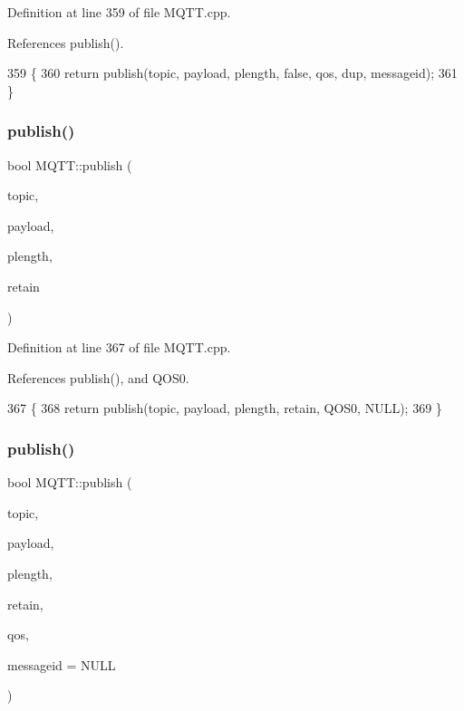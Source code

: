 Definition at line 359 of file M\+Q\+T\+T.\+cpp.



References publish().


\begin{DoxyCode}
359                                                                                                            
                           \{
360     \textcolor{keywordflow}{return} publish(topic, payload, plength, \textcolor{keyword}{false}, qos, dup, messageid);
361 \}
\end{DoxyCode}
\mbox{\label{class_m_q_t_t_ac827a753cde9ed29783dc60092990072}} 
\subsubsection{publish()\hspace{0.1cm}{\footnotesize\ttfamily [8/10]}}
{\footnotesize\ttfamily bool M\+Q\+T\+T\+::publish (\begin{DoxyParamCaption}\item[{const char $\ast$}]{topic,  }\item[{const uint8\+\_\+t $\ast$}]{payload,  }\item[{unsigned int}]{plength,  }\item[{bool}]{retain }\end{DoxyParamCaption})}



Definition at line 367 of file M\+Q\+T\+T.\+cpp.



References publish(), and Q\+O\+S0.


\begin{DoxyCode}
367                                                                                                \{
368     \textcolor{keywordflow}{return} publish(topic, payload, plength, retain, QOS0, NULL);
369 \}
\end{DoxyCode}
\mbox{\label{class_m_q_t_t_a12d6e2ff5b2aadb36e2fd7abed4fa46b}} 
\subsubsection{publish()\hspace{0.1cm}{\footnotesize\ttfamily [9/10]}}
{\footnotesize\ttfamily bool M\+Q\+T\+T\+::publish (\begin{DoxyParamCaption}\item[{const char $\ast$}]{topic,  }\item[{const uint8\+\_\+t $\ast$}]{payload,  }\item[{unsigned int}]{plength,  }\item[{bool}]{retain,  }\item[{\textbf{ E\+M\+Q\+T\+T\+\_\+\+Q\+OS}}]{qos,  }\item[{uint16\+\_\+t $\ast$}]{messageid = {\ttfamily NULL} }\end{DoxyParamCaption})}



